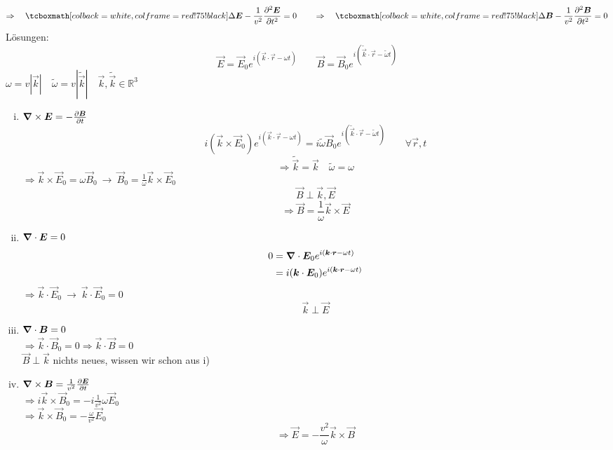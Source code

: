 \begin{equation*}
\Rightarrow \quad \rmbox{\Delta \vec{E} - \frac{1}{v^2} \prt{^2 \vec{E}}{t^2} = 0} \qquad 
\Rightarrow \quad \rmbox{\Delta \vec{B} - \frac{1}{v^2} \prt{^2 \vec{B}}{t^2} = 0}
\end{equation*}
Lösungen:
\begin{equation*}
\vec{E} = \vec{E}_0 e^{i(\vec{k} \cdot \vec{r} - \omega t)} \qquad \vec{B} = \vec{B}_0 e^{i(\tilde{\vec{k}} \cdot \vec{r} - \tilde{\omega} t)}
\end{equation*}
$ \omega = v |\vec{k}| \quad \tilde{\omega} = v |\tilde{\vec{k}}| \quad \vec{k}, \tilde{\vec{k}} \in \mathbb{R}^3 $
\begin{enumerate}[i)]
	\item $ \bm{\nabla} \times \bm{E} = - \frac{\partial \bm{B}}{\partial t} $
	\begin{equation*}
	i (\vec{k} \times \vec{E}_0) e^{i(\vec{k} \cdot \vec{r} - \omega t)} = i \tilde{\omega} \vec{B}_0 e^{i(\tilde{\vec{k}} \cdot \vec{r} - \tilde\omega t)} \qquad \forall \vec{r},t
	\end{equation*}
	$$ \Rightarrow \tilde{\vec{k}} = \vec{k} \quad \tilde{\omega} = \omega $$
	$ \Rightarrow \vec{k} \times \vec{E}_0 = \omega \vec{B}_0 \ \rightarrow \ \vec{B}_0 = \frac{1}{\omega} \vec{k} \times \vec{E}_0 $
	$$\vec{B} \perp \vec{k}, \vec{E}$$
	$$ \Rightarrow \vec{B} = \frac{1}{\omega} \vec{k} \times \vec{E} $$
	\item $ \bm{\nabla} \cdot \bm{E} = 0 $
	\begin{align*}
	0 &= \bm{\nabla} \cdot \bm{E}_0 e^{i(\bm{k} \cdot \bm{r} - \omega t)}\\
	&= i(\bm{k} \cdot \bm{E}_0) e^{i(\bm{k} \cdot \bm{r} - \omega t)}
	\end{align*}
	$ \Rightarrow \vec{k} \cdot \vec{E}_0 \ \rightarrow \ \vec{k} \cdot \vec{E}_0 = 0 $
	$$ \vec{k} \perp \vec{E} $$
	\item $ \bm{\nabla} \cdot \bm{B} = 0 $\\
	$ \Rightarrow \vec{k} \cdot \vec{B}_0 = 0 \Rightarrow \vec{k} \cdot \vec{B} = 0 $\\
	$ \vec{B} \perp \vec{k} $ nichts neues, wissen wir schon aus i)
	\item $ \bm{\nabla} \times \bm{B} = \frac{1}{v^2} \frac{\partial \bm{E}}{\partial t} $\\
	$ \Rightarrow i \vec{k} \times \vec{B}_0 = - i \frac{1}{v^2} \omega \vec{E}_0 $\\
	$ \Rightarrow \vec{k} \times \vec{B}_0 = - \frac{\omega}{v^2} \vec{E}_0 $\\
	$$ \Rightarrow \vec{E} = -\frac{v^2}{\omega} \vec{k} \times \vec{B} $$
\end{enumerate}
